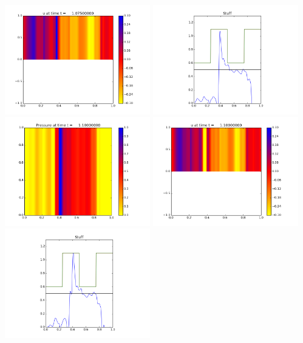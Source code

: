 \documentclass[11pt]{article}
\begin{document}
\includegraphics[width=0.475\textwidth]{frame0043fig1.png}
\vskip 10pt 
\includegraphics[width=0.475\textwidth]{frame0043fig3.png}
\vskip 10pt 
\includegraphics[width=0.475\textwidth]{frame0044fig0.png}
\includegraphics[width=0.475\textwidth]{frame0044fig1.png}
\vskip 10pt 
\includegraphics[width=0.475\textwidth]{frame0044fig3.png}
\end{document}
